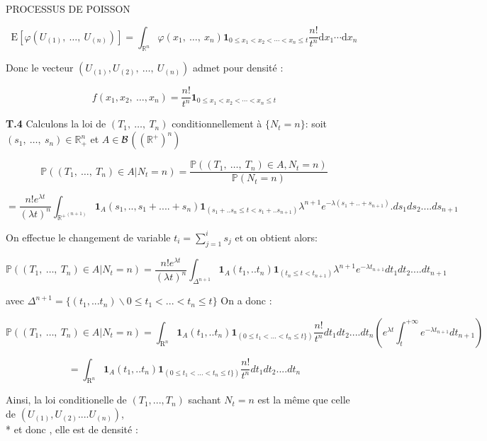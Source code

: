 PROCESSUS DE POISSON\documentclass[a4paper,10pt]{article}
\begin{document}
$$
\mathrm{E}[\varphi(U_{(1)},\ \ldots,\ U_{(n)})]= \int_{\mathbb{R}^{n}}\varphi(x_{1},\ \ldots,\ x_{n})\textbf{1}_{0\leq x_{1}<x_{2}<\cdots<x_{n}\leq t}\frac{n!}{t^n}\mathrm{d}x_{1}\cdots \mathrm{d}x_{n}
$$

Donc le vecteur $(U_{(1)},U_{(2)},\ \ldots,\ U_{(n)})$ admet pour densité :

$$
f(x_1,x_2,\ \ldots,x_n)=\frac{n!}{t^n}\textbf{1}_{0\leq x_{1}<x_{2}<\cdots<x_{n}\leq t}
$$

\textbf{T.4} Calculons la loi de $(T_{1},\ \ldots,\ T_{n})$ conditionnellement \`{a} $\{N_{t}=n\}$: soit $(s_{1},\ \ldots,\ s_{n})\in \mathbb{R}_{+}^{n}$ et $A \in$$\cal{B}$$((\mathbb{R}^+)^n)$

$$
\mathbb{P}((T_{1},\ \ldots,\ T_{n})\in A|N_{t}=n)=\frac{\mathbb{P}((T_{1},\ \ldots,\ T_{n})\in A,N_{t}=n)}{\mathbb{P}(N_{t}=n)}
$$

$$
=\frac{n!e^{\lambda t}}{(\lambda t)^{n}}\int_{{\mathbb{R^{+}}}^{(n+1)}}
\textbf{1}_{A}(s_1,..,s_1+....+s_n)\textbf{1}_(s_1+..s_n\leq t<s_1+..s_{n+1})
{\lambda}^{n+1}e^{-{\lambda}(s_1+..+s_{n+1})}.ds_1ds_2....ds_{n+1}
$$

On effectue le changement de variable $t_i=\sum_{j=1}^{i}s_j$ et on obtient alors:

$$
\mathbb{P}((T_{1},\ \ldots,\ T_{n})\in A|N_{t}=n)=\frac{n!e^{\lambda t}}{(\lambda t)^{n}}\int_{{\Delta}^{n+1}}
\textbf{1}_{A}(t_1,..t_n)\textbf{1}_(t_n\leq t<t_{n+1})
{\lambda}^{n+1}e^{-{\lambda}t_{n+1}}dt_1dt_2....dt_{n+1}
$$


avec $\Delta^{n+1}=\lbrace (t_1,...t_n)\backslash  0\leq t_{1}<...<t_{n}\leq t\rbrace$
On a donc :

$$
\mathbb{P}((T_{1},\ \ldots,\ T_{n})\in A|N_{t}=n)=\int_{\mathrm{R}^n}\textbf{1}_{A}(t_1,..t_n)\textbf{1}_{( 0\leq t_{1}<...<t_{n}\leq t\rbrace)}\frac{n!}{t^n}dt_1dt_2....dt_n(e^{\lambda t}\int_{t}^{+\infty}e^{-{\lambda}t_{n+1}}dt_{n+1})
$$

$$
=\int_{\mathrm{R}^n}\textbf{1}_{A}(t_1,..t_n)\textbf{1}_{( 0\leq t_{1}<...<t_{n}\leq t\rbrace)}\frac{n!}{t^n}dt_1dt_2....dt_n
$$

Ainsi, la loi conditionelle de $(T_1,...,T_n) $ sachant $N_t=n$ est la m\^{e}me que celle de $(U_{(1)},U_{(2)}....U_{(n)})$,\\* et donc , elle est de densité :
\end{document}
